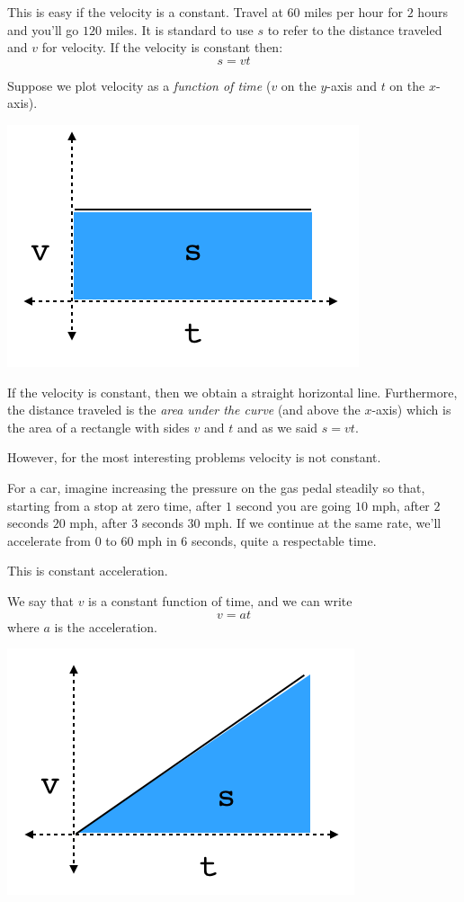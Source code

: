 \documentclass[11pt, oneside]{article}
\begin{document}
This is easy if the velocity is a constant.  Travel at $60$ miles per hour for $2$ hours and you'll go $120$ miles.  It is standard to use $s$ to refer to the distance traveled and $v$ for velocity.  If the velocity is constant then:
\[ s = vt \]

Suppose we plot velocity as a \emph{function of time} ($v$ on the $y$-axis and $t$ on the $x$-axis).

\begin{center} \includegraphics [scale=0.5] {velocity_time1.png} \end{center}

If the velocity is constant, then we obtain a straight horizontal line.  Furthermore, the distance traveled is the \emph{area under the curve} (and above the $x$-axis) which is the area of a rectangle with sides $v$ and $t$ and as we said $s = vt$.

However, for the most interesting problems velocity is not constant.  

For a car, imagine increasing the pressure on the gas pedal steadily so that, starting from a stop at zero time, after $1$ second you are going $10$ mph, after $2$ seconds $20$ mph, after $3$ seconds $30$ mph. If we continue at the same rate, we'll accelerate from $0$ to $60$ mph in $6$ seconds, quite a respectable time.

This is constant acceleration.

We say that $v$ is a constant function of time, and we can write 
\[ v = at \]
where $a$ is the acceleration.

\begin{center} \includegraphics [scale=0.5] {velocity_time2.png} \end{center}
\end{document}
